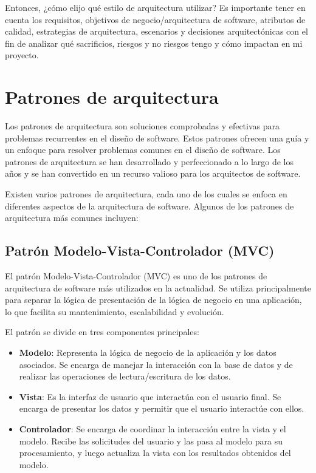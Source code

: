 \documentclass[executivepaper]{article}
\begin{document}
Entonces, ¿cómo elijo qué estilo de arquitectura utilizar? Es importante tener en cuenta los requisitos, objetivos de negocio/arquitectura de software, atributos de calidad, estrategias de arquitectura, escenarios y decisiones arquitectónicas con el fin de analizar qué sacrificios, riesgos y no riesgos tengo y cómo impactan en mi proyecto.

\newpage
\section{Patrones de arquitectura}
Los patrones de arquitectura son soluciones comprobadas y efectivas para problemas recurrentes en el diseño de software. Estos patrones ofrecen una guía y un enfoque para resolver problemas comunes en el diseño de software. Los patrones de arquitectura se han desarrollado y perfeccionado a lo largo de los años y se han convertido en un recurso valioso para los arquitectos de software.

Existen varios patrones de arquitectura, cada uno de los cuales se enfoca en diferentes aspectos de la arquitectura de software. Algunos de los patrones de arquitectura más comunes incluyen:

\subsection{Patrón Modelo-Vista-Controlador (MVC)}

El patrón Modelo-Vista-Controlador (MVC) es uno de los patrones de arquitectura de software más utilizados en la actualidad. Se utiliza principalmente para separar la lógica de presentación de la lógica de negocio en una aplicación, lo que facilita su mantenimiento, escalabilidad y evolución.

El patrón se divide en tres componentes principales:

\begin{itemize}
\item \textbf{Modelo}: Representa la lógica de negocio de la aplicación y los datos asociados. Se encarga de manejar la interacción con la base de datos y de realizar las operaciones de lectura/escritura de los datos.

\item \textbf{Vista}: Es la interfaz de usuario que interactúa con el usuario final. Se encarga de presentar los datos y permitir que el usuario interactúe con ellos.

\item \textbf{Controlador}: Se encarga de coordinar la interacción entre la vista y el modelo. Recibe las solicitudes del usuario y las pasa al modelo para su procesamiento, y luego actualiza la vista con los resultados obtenidos del modelo.
\end{itemize}
\end{document}
